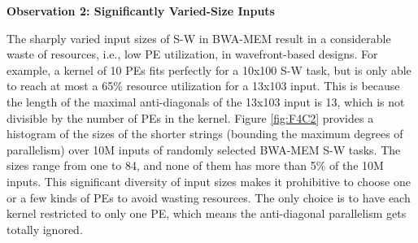 \vspace{1pt}
\textbf{Observation 2: Significantly Varied-Size Inputs}
\vspace{1pt}

The sharply varied input sizes of S-W in BWA-MEM result in a considerable waste of resources, i.e., low PE utilization, in wavefront-based designs. 
For example, a kernel of 10 PEs fits perfectly for a 10x100 S-W task, but is only able to reach at most a 65\% resource utilization for a 13x103 input. 
This is because the length of the maximal anti-diagonals of the 13x103 input is 13, 
which is not divisible by the number of PEs in the kernel.
Figure \ref{fig:F4C2} provides a histogram of the sizes of the shorter strings (bounding the maximum degrees of parallelism) over 10M inputs of randomly selected BWA-MEM S-W tasks. 
The sizes range from one to 84, and none of them has more than 5\% of the 10M inputs. 
This significant diversity of input sizes makes it prohibitive to choose one or a few kinds of PEs to avoid wasting resources.
The only choice is to have each kernel restricted to only one PE, which means the anti-diagonal parallelism gets totally ignored.

